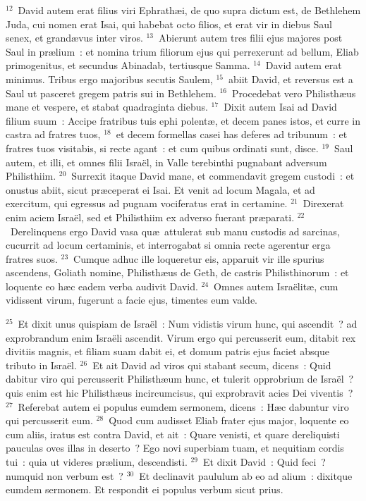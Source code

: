 ${}^{12}$~David autem erat filius viri Ephrath\ae i, de quo supra dictum est, de Bethlehem Juda, cui nomen erat Isai, qui habebat octo filios, et erat vir in diebus Saul senex, et grand\ae vus inter viros.
${}^{13}$~Abierunt autem tres filii ejus majores post Saul in pr\ae lium~: et nomina trium filiorum ejus qui perrexerunt ad bellum, Eliab primogenitus, et secundus Abinadab, tertiusque Samma.
${}^{14}$~David autem erat minimus. Tribus ergo majoribus secutis Saulem,
${}^{15}$~abiit David, et reversus est a Saul ut pasceret gregem patris sui in Bethlehem.
${}^{16}$~Procedebat vero Philisth\ae us mane et vespere, et stabat quadraginta diebus.
${}^{17}$~Dixit autem Isai ad David filium suum~: Accipe fratribus tuis ephi polent\ae , et decem panes istos, et curre in castra ad fratres tuos,
${}^{18}$~et decem formellas casei has deferes ad tribunum~: et fratres tuos visitabis, si recte agant~: et cum quibus ordinati sunt, disce.
${}^{19}$~Saul autem, et illi, et omnes filii Isra\"el, in Valle terebinthi pugnabant adversum Philisthiim.
${}^{20}$~Surrexit itaque David mane, et commendavit gregem custodi~: et onustus abiit, sicut pr\ae ceperat ei Isai. Et venit ad locum Magala, et ad exercitum, qui egressus ad pugnam vociferatus erat in certamine.
${}^{21}$~Direxerat enim aciem Isra\"el, sed et Philisthiim ex adverso fuerant pr\ae parati.
${}^{22}$~Derelinquens ergo David vasa qu\ae\ attulerat sub manu custodis ad sarcinas, cucurrit ad locum certaminis, et interrogabat si omnia recte agerentur erga fratres suos.
${}^{23}$~Cumque adhuc ille loqueretur eis, apparuit vir ille spurius ascendens, Goliath nomine, Philisth\ae us de Geth, de castris Philisthinorum~: et loquente eo h\ae c eadem verba audivit David.
${}^{24}$~Omnes autem Isra\"elit\ae , cum vidissent virum, fugerunt a facie ejus, timentes eum valde.


${}^{25}$~Et dixit unus quispiam de Isra\"el~: Num vidistis virum hunc, qui ascendit~? ad exprobrandum enim Isra\"eli ascendit. Virum ergo qui percusserit eum, ditabit rex divitiis magnis, et filiam suam dabit ei, et domum patris ejus faciet absque tributo in Isra\"el.
${}^{26}$~Et ait David ad viros qui stabant secum, dicens~: Quid dabitur viro qui percusserit Philisth\ae um hunc, et tulerit opprobrium de Isra\"el~? quis enim est hic Philisth\ae us incircumcisus, qui exprobravit acies Dei viventis~?
${}^{27}$~Referebat autem ei populus eumdem sermonem, dicens~: H\ae c dabuntur viro qui percusserit eum.
${}^{28}$~Quod cum audisset Eliab frater ejus major, loquente eo cum aliis, iratus est contra David, et ait~: Quare venisti, et quare dereliquisti pauculas oves illas in deserto~? Ego novi superbiam tuam, et nequitiam cordis tui~: quia ut videres pr\ae lium, descendisti.
${}^{29}$~Et dixit David~: Quid feci~? numquid non verbum est~?
${}^{30}$~Et declinavit paululum ab eo ad alium~: dixitque eumdem sermonem. Et respondit ei populus verbum sicut prius.


